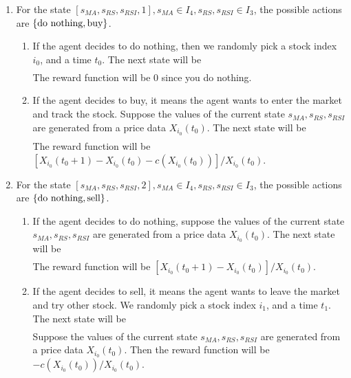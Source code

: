 \documentclass[11pt,a4paper]{article}
\numberwithin{equation}{section}
\newcommand{\set}[1]{\qty{#1}}
\begin{document}
\begin{enumerate}
  \item For the state $[s_{MA}, s_{RS}, s_{RSI}, 1], s_{MA} \in I_4, s_{RS}, s_{RSI} \in I_3$, the possible actions are $\set{\text{do nothing}, \text{buy}}$.
        \begin{enumerate}
          \item If the agent decides to do nothing, then we randomly pick a stock index $i_0$, and a time $t_0$. The next state will be
                \begin{align}
                  [S_{MA} (t_0; X_{i_0}), S_{RS} (t_0; X_{i_0}), S_{RSI} (t_0; X_{i_0}), 1]
                \end{align}
                The reward function will be $0$ since you do nothing.
          \item If the agent decides to buy, it means the agent wants to enter the market and track the stock. Suppose the values of the current state $s_{MA}, s_{RS}, s_{RSI}$ are generated from a price data $X_{i_0} (t_0)$. The next state will be
                \begin{align}
                  [S_{MA} (t_0 + 1; X_{i_0}), S_{RS} (t_0 + 1; X_{i_0}), S_{RSI} (t_0 + 1; X_{i_0}), 2]
                \end{align}
                The reward function will be $[X_{i_0} (t_0 + 1) - X_{i_0} (t_0) - c(X_{i_0} (t_0))] / X_{i_0} (t_0)$.
        \end{enumerate}
  \item For the state $[s_{MA}, s_{RS}, s_{RSI}, 2], s_{MA} \in I_4, s_{RS}, s_{RSI} \in I_3$, the possible actions are $\set{\text{do nothing}, \text{sell}}$.
        \begin{enumerate}
          \item If the agent decides to do nothing, suppose the values of the current state $s_{MA}, s_{RS}, s_{RSI}$ are generated from a price data $X_{i_0} (t_0)$. The next state will be
                \begin{align}
                  [S_{MA} (t_0 + 1; X_{i_0}), S_{RS} (t_0 + 1; X_{i_0}), S_{RSI} (t_0 + 1; X_{i_0}), 2]
                \end{align}
                The reward function will be $[X_{i_0} (t_0 + 1) - X_{i_0} (t_0)] / X_{i_0} (t_0)$.
          \item If the agent decides to sell, it means the agent wants to leave the market and try other stock. We randomly pick a stock index $i_1$, and a time $t_1$. The next state will be
                \begin{align}
                  [S_{MA} (t_1; X_{i_1}), S_{RS} (t_1; X_{i_1}), S_{RSI} (t_1; X_{i_1}), 1]
                \end{align}
                Suppose the values of the current state $s_{MA}, s_{RS}, s_{RSI}$ are generated from a price data $X_{i_0} (t_0)$. Then the reward function will be $- c(X_{i_0} (t_0)) / X_{i_0} (t_0)$.
        \end{enumerate}
\end{enumerate}
\end{document}

